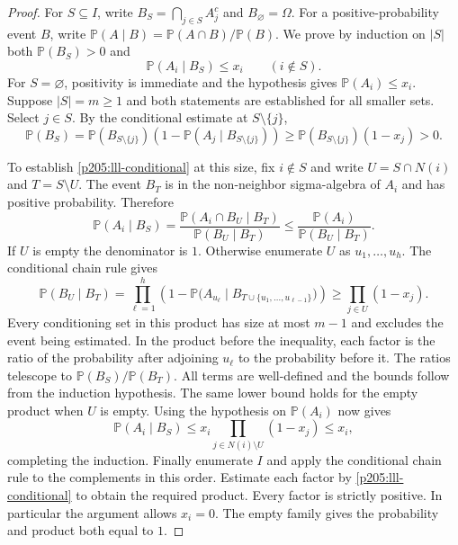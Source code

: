 \documentclass[11pt,oneside,openany]{book}
\theoremstyle{plain}
\theoremstyle{definition}
\theoremstyle{remark}
\begin{document}
\begin{proof}
For \(S\subseteq I\), write \(B_S=\bigcap_{j\in S}A_j^c\) and
\(B_\varnothing=\Omega\). For a positive-probability event \(B\),
write \(\mathbb P(A\mid B)=\mathbb P(A\cap B)/\mathbb P(B)\).
We prove by induction on \(|S|\) both
\(\mathbb P(B_S)>0\) and
\begin{equation}\label{p205:lll-conditional}
     \mathbb P(A_i\mid B_S)\le x_i
     \qquad(i\notin S).
\end{equation}
For \(S=\varnothing\), positivity is immediate and the hypothesis
gives \(\mathbb P(A_i)\le x_i\). Suppose \(|S|=m\ge1\) and both
statements are established for all smaller sets. Select \(j\in S\).
By the conditional estimate at \(S\setminus\{j\}\),
\[
 \mathbb P(B_S)=\mathbb P(B_{S\setminus\{j\}})
         (1-\mathbb P(A_j\mid B_{S\setminus\{j\}}))
     \ge \mathbb P(B_{S\setminus\{j\}})(1-x_j)>0 .
\]

To establish \eqref{p205:lll-conditional} at this size, fix \(i\notin S\)
and write \(U=S\cap N(i)\) and \(T=S\setminus U\). The event \(B_T\)
is in the non-neighbor sigma-algebra of \(A_i\) and has positive
probability. Therefore
\[
  \mathbb P(A_i\mid B_S)=
    \frac{\mathbb P(A_i\cap B_U\mid B_T)}
         {\mathbb P(B_U\mid B_T)}
    \le \frac{\mathbb P(A_i)}{\mathbb P(B_U\mid B_T)}.
\]
If \(U\) is empty the denominator is \(1\). Otherwise enumerate
\(U\) as \(u_1,\ldots,u_h\). The conditional chain rule gives
\[
 \mathbb P(B_U\mid B_T)
 =\prod_{\ell=1}^h\!
     \left(1-\mathbb P\bigl(A_{u_\ell}\mid
            B_{T\cup\{u_1,\ldots,u_{\ell-1}\}}\bigr)\right)
 \ge \prod_{j\in U}(1-x_j).
\]
Every conditioning set in this product has size at most \(m-1\)
and excludes the event being estimated. In the product before the
inequality, each factor is the ratio of the probability after
adjoining \(u_\ell\) to the probability before it. The ratios
telescope to \(\mathbb P(B_S)/\mathbb P(B_T)\). All terms are
well-defined and the bounds follow from the induction hypothesis.
The same lower bound holds for the empty product when \(U\) is empty.
Using the hypothesis on \(\mathbb P(A_i)\) now gives
\[
  \mathbb P(A_i\mid B_S)\le
   x_i\prod_{j\in N(i)\setminus U}(1-x_j)\le x_i,
\]
completing the induction. Finally enumerate \(I\) and apply the
conditional chain rule to the complements in this order. Estimate
each factor by \eqref{p205:lll-conditional} to obtain the required
product. Every factor is strictly positive. In particular the argument
allows \(x_i=0\). The empty family gives the probability and product
both equal to \(1\).
\end{proof}
\end{document}
